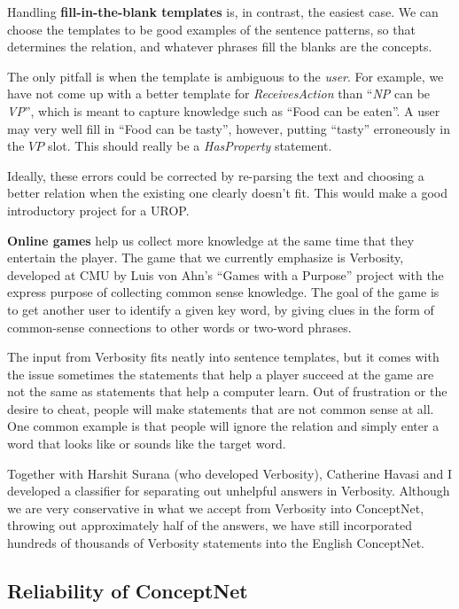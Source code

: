 \documentclass[11pt]{article}
\begin{document}
Handling {\bf fill-in-the-blank templates} is, in contrast, the easiest case.
We can choose the templates to be good examples of the sentence patterns, so
that determines the relation, and whatever phrases fill the blanks are the
concepts.

The only pitfall is when the template is ambiguous to the {\em user}.
For example, we have not come up with a better template for {\em
ReceivesAction}
than ``{\em NP} can be {\em VP}'', which is meant to capture knowledge such as ``Food
can be eaten''. A user may very well fill in ``Food can be tasty'', however,
putting ``tasty'' erroneously in the $VP$ slot. This should really be a {\em
HasProperty} statement.

Ideally, these errors could be corrected by re-parsing the text and choosing a
better relation when the existing one clearly doesn't fit.  This would make a
good introductory project for a UROP.

{\bf Online games} help us collect more knowledge at the same time that they
entertain the player. The game that we currently emphasize is Verbosity,
developed at CMU by Luis von Ahn's ``Games with a Purpose'' project \cite{gwap}
with the express purpose of collecting common sense knowledge. The goal of the
game is to get another user to identify a given key word, by giving clues in
the form of common-sense connections to other words or two-word phrases.

The input from Verbosity fits neatly into sentence templates, but it comes with
the issue sometimes the statements that help a player succeed at the game are
not the same as statements that help a computer learn.  Out of frustration or
the desire to cheat, people will make statements that are not common sense at
all. One common example is that people will ignore the relation and simply
enter a word that looks like or sounds like the target word.

Together with Harshit Surana (who developed Verbosity), Catherine Havasi and I
developed a classifier for separating out unhelpful answers in Verbosity.
Although we are very conservative in what we accept from Verbosity into
ConceptNet, throwing out approximately half of the answers, we have still
incorporated hundreds of thousands of Verbosity statements into the English
ConceptNet.

\subsection{Reliability of ConceptNet}
\end{document}
